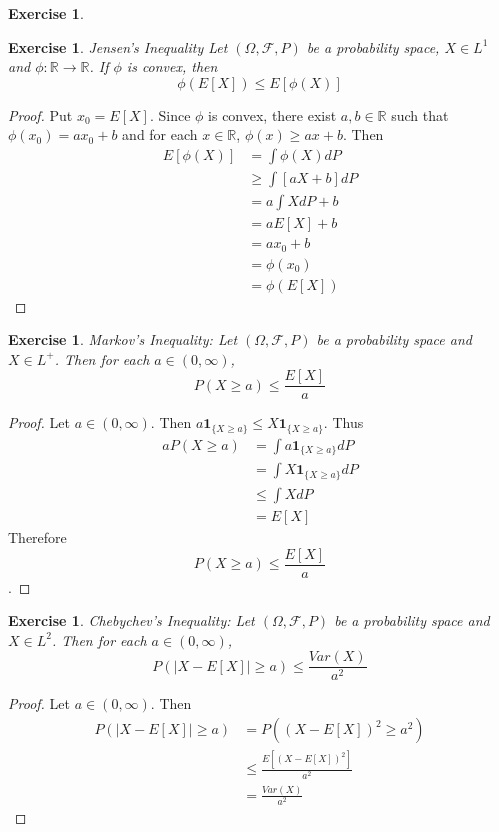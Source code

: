 \documentclass[12pt]{amsart}
\newtheorem{ex}[thm]{Exercise}
\newcommand{\Om}{\Omega}
\newcommand{\R}{\mathbb{R}}
\newcommand{\MF}{\mathcal{F}}
\begin{document}
\begin{ex}

\end{ex}

\begin{ex}{Jensen's Inequality}
Let $(\Om, \MF, P)$ be a probability space, $X \in L^1$ and $\phi:\R \rightarrow \R$. If $\phi$ is convex, then $$\phi(E[X]) \leq E[\phi(X)]$$
\end{ex}

\begin{proof}
Put $x_0 = E[X]$. Since $\phi$ is convex, there exist $a,b \in \R$ such that $\phi(x_0) = ax_0+b$ and for each $x \in \R$, $\phi(x) \geq ax+b$. Then \begin{align*}
E[\phi(X)] 
&= \int\phi(X) dP \\
&\geq \int[ aX+b ]dP \\
&= a\int X dP +b \\
&= aE[X] +b \\
&= ax_0+b \\
&= \phi(x_0) \\
&= \phi(E[X])
\end{align*}
\end{proof}

\begin{ex}{Markov's Inequality:}
Let $(\Om, \MF, P)$ be a probability space and $X \in L^+$. Then for each $a \in (0,\infty)$, $$P(X \geq a) \leq \frac{E[X]}{a}$$
\end{ex}

\begin{proof}
Let $a \in (0,\infty)$. Then $a \mathbf{1}_{\{X \geq a\}} \leq X \mathbf{1}_{\{X \geq a\}}$. Thus 
\begin{align*}
a P(X \geq a) 
&= \int a \mathbf{1}_{\{X \geq a\}} dP\\
&= \int X \mathbf{1}_{\{X \geq a\}} dP\\
&\leq \int X dP \\
&= E[X]
\end{align*}
Therefore $$P(X \geq a) \leq \frac{E[X]}{a}$$. 
\end{proof}

\begin{ex}{Chebychev's Inequality:}
Let $(\Om, \MF, P)$ be a probability space and $X \in L^2$. Then for each $a \in (0, \infty)$, $$P(\vert X - E[X] \vert \geq a) \leq \frac{Var(X)}{a^2}$$
\end{ex}

\begin{proof}
Let $a \in (0, \infty)$. Then 
\begin{align*}
P(\vert X - E[X] \vert \geq a) 
&= P((X - E[X])^2 \geq a^2) \\
&\leq \frac{E[(X - E[X])^2]}{a^2} \\
&= \frac{Var(X)}{a^2}  
\end{align*}
\end{proof}
\end{document}
